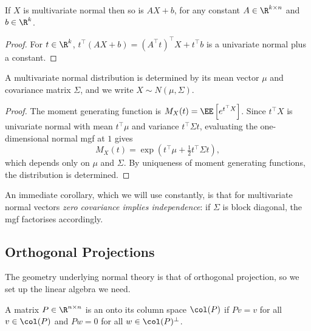 \begin{proposition}
  If $X$ is multivariate normal then so is $AX + b$, for any constant $A \in \R^{k\times n}$ and $b \in \R^k$.
\end{proposition}
\begin{proof}
  For $t \in \R^k$, $t^\top(AX+b) = (A^\top t)^\top X + t^\top b$ is a univariate normal plus a constant.
\end{proof}

\begin{proposition}
  A multivariate normal distribution is determined by its mean vector $\mu$ and covariance matrix $\Sigma$, and we write $X \sim N(\mu,\Sigma)$.
\end{proposition}
\begin{proof}
  The moment generating function is $M_X(t) = \EE\left[e^{t^\top X}\right]$. Since $t^\top X$ is univariate normal with mean $t^\top\mu$ and variance $t^\top\Sigma t$, evaluating the one-dimensional normal mgf at $1$ gives
  $$
  M_X(t) = \exp\left(t^\top\mu + \tfrac{1}{2}t^\top\Sigma t\right),
  $$
  which depends only on $\mu$ and $\Sigma$. By uniqueness of moment generating functions, the distribution is determined.
\end{proof}

An immediate corollary, which we will use constantly, is that for multivariate normal vectors \emph{zero covariance implies independence}: if $\Sigma$ is block diagonal, the mgf factorises accordingly.

\subsection{Orthogonal Projections}

The geometry underlying normal theory is that of orthogonal projection, so we set up the linear algebra we need.

\begin{definition}
  A matrix $P \in \R^{n\times n}$ is an  onto its column space $\col(P)$ if $Pv = v$ for all $v \in \col(P)$ and $Pw = 0$ for all $w \in \col(P)^\perp$.
\end{definition}

